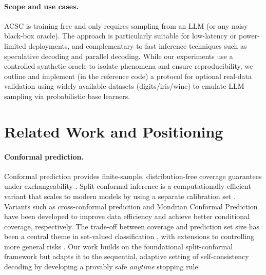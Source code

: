 \documentclass[11pt]{article}
\begin{document}
\paragraph{Scope and use cases.}
ACSC is training-free and only requires sampling from an LLM (or any noisy black-box oracle). The approach is particularly suitable for low-latency or power-limited deployments, and complementary to fast inference techniques such as speculative decoding and parallel decoding. While our experiments use a controlled synthetic oracle to isolate phenomena and ensure reproducibility, we outline and implement (in the reference code) a protocol for optional real-data validation using widely available datasets (digits/iris/wine) to emulate LLM sampling via probabilistic base learners.

\section{Related Work and Positioning}
\label{sec:related}
\paragraph{Conformal prediction.}
Conformal prediction provides finite-sample, distribution-free coverage guarantees under exchangeability \cite{vovk2005algorithmic, shafer2008tutorial, lei2018distribution}.
Split conformal inference is a computationally efficient variant that scales to modern models by using a separate calibration set \cite{angelopoulos2021gentle, romano2019conformalized, barber2021predictive, tibshirani2019conformal}.
Variants such as cross-conformal prediction \cite{vovk2015cross} and Mondrian Conformal Prediction \cite{vovk2003mondrian} have been developed to improve data efficiency and achieve better conditional coverage, respectively.
The trade-off between coverage and prediction set size has been a central theme in set-valued classification \cite{sadinle2019least, park2020pac, angelopoulos2020uncertainty}, with extensions to controlling more general risks \cite{angelopoulos2022conformal}. Our work builds on the foundational split-conformal framework but adapts it to the sequential, adaptive setting of self-consistency decoding by developing a provably safe \emph{anytime} stopping rule.
\end{document}
